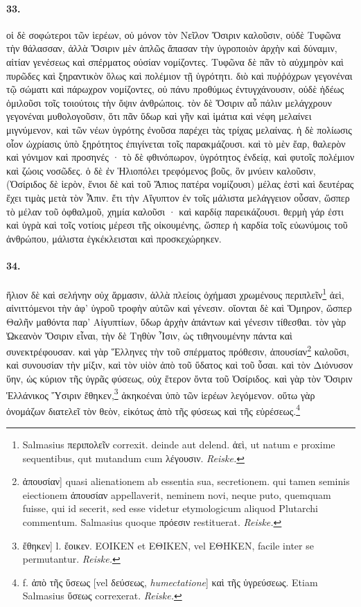\documentclass[a4paper, 11pt, oneside, polutonikogreek, german]{article}
\begin{document}
\paragraph{33.}
οἱ δὲ σοφώτεροι τῶν ἱερέων, οὐ μόνον τὸν Νεῖλον Ὄσιριν καλοῦσιν, οὐδὲ Τυφῶνα τὴν θάλασσαν, ἀλλὰ Ὄσιριν μὲν ἁπλῶς ἅπασαν τὴν ὑγροποιὸν ἀρχὴν καὶ δύναμιν, αἰτίαν γενέσεως καὶ σπέρματος οὐσίαν νομίζοντες. Τυφῶνα δὲ πᾶν τὸ αὐχμηρὸν καὶ πυρῶδες καὶ ξηραντικὸν ὅλως καὶ πολέμιον τῇ ὑγρότητι. διὸ καὶ πυῤῥόχρων γεγονέναι τῷ σώματι καὶ πάρωχρον νομίζοντες, οὐ πάνυ προθύμως ἐντυγχάνουσιν, οὐδὲ ἡδέως ὁμιλοῦσι τοῖς τοιούτοις τὴν ὄψιν ἀνθρώποις. τὸν δὲ Ὄσιριν αὖ πάλιν μελάγχρουν γεγονέναι μυθολογοῦσιν, ὅτι πᾶν ὕδωρ καὶ γῆν καὶ ἱμάτια καὶ νέφη μελαίνει μιγνύμενον, καὶ τῶν νέων ὑγρότης ἐνοῦσα παρέχει τὰς τρίχας μελαίνας. ἡ δὲ πολίωσις οἷον ὠχρίασις ὑπὸ ξηρότητος ἐπιγίνεται τοῖς παρακμάζουσι. καὶ τὸ μὲν ἔαρ, θαλερὸν καὶ γόνιμον καὶ προσηνές · τὸ δὲ φθινόπωρον, ὑγρότητος ἐνδείᾳ, καὶ φυτοῖς πολέμιον καὶ ζώοις νοσῶδες. ὁ δὲ ἐν Ἡλιοπόλει τρεφόμενος βοῦς, ὃν μνύειν καλοῦσιν, (Ὀσίριδος δὲ ἱερὸν, ἔνιοι δὲ καὶ τοῦ Ἄπιος πατέρα νομίζουσι) μέλας ἐστὶ καὶ δευτέρας ἔχει τιμὰς μετὰ τὸν Ἆπιν. ἔτι τὴν Αἴγυπτον ἐν τοῖς μάλιστα μελάγγειον οὖσαν, ὥσπερ τὸ μέλαν τοῦ ὀφθαλμοῦ, χημία καλοῦσι · καὶ καρδίᾳ παρεικάζουσι. θερμὴ γάρ ἐστι καὶ ὑγρὰ καὶ τοῖς νοτίοις μέρεσι τῆς οἰκουμένης, ὥσπερ ἡ καρδία τοῖς εὐωνύμοις τοῦ ἀνθρώπου, μάλιστα ἐγκέκλεισται καὶ προσκεχώρηκεν.

\paragraph{34.}
ἥλιον δὲ καὶ σελήνην οὐχ ἅρμασιν, ἀλλὰ πλείοις ὀχήμασι χρωμένους περιπλεῖν\footnote{Salmasius περιπολεῖν correxit. deinde aut delend. ἁεὶ, ut natum e proxime sequentibus, qut mutandum cum λέγουσιν. \emph{Reiske.}} ἀεὶ, αἰνιττόμενοι τὴν ἀφ' ὑγροῦ τροφὴν αὐτῶν καὶ γένεσιν. οἴονται δὲ καὶ Ὅμηρον, ὥσπερ Θαλῆν μαθόντα παρ' Αἰγυπτίων, ὕδωρ ἀρχὴν ἁπάντων καὶ γένεσιν τίθεσθαι. τὸν γὰρ Ὠκεανὸν Ὄσιριν εἶναι, τὴν δὲ Τηθὺν Ἶσιν, ὡς τιθηνουμένην πάντα καὶ συνεκτρέφουσαν. καὶ γὰρ Ἕλληνες τὴν τοῦ σπέρματος πρόθεσιν, ἀπουσίαν\footnote{ἀπουσίαν] quasi alienationem ab essentia sua, secretionem. qui tamen seminis eiectionem ἀπουσίαν appellaverit, neminem novi, neque puto, quemquam fuisse, qui id secerit, sed esse videtur etymologicum aliquod Plutarchi commentum. Salmasius quoque πρόεσιν restituerat. \emph{Reiske.}} καλοῦσι, καὶ συνουσίαν τὴν μίξιν, καὶ τὸν υἱὸν ἀπὸ τοῦ ὕδατος καὶ τοῦ ὗσαι. καὶ τὸν Διόνυσον ὕην, ὡς κύριον τῆς ὑγρᾶς φύσεως, οὐχ ἕτερον ὄντα τοῦ Ὀσίριδος. καὶ γὰρ τὸν Ὄσιριν Ἑλλάνικος Ὕσιριν ἔθηκεν,\footnote{ἔθηκεν] l. ἔοικεν. ΕΟΙΚΕΝ et ΕΘΙΚΕΝ, vel ΕΘΗΚΕΝ, facile inter se permutantur. \emph{Reiske.}} ἀκηκοέναι ὑπὸ τῶν ἱερέων λεγόμενον. οὕτω γὰρ ὀνομάζων διατελεῖ τὸν θεὸν, εἰκότως ἀπὸ τῆς φύσεως καὶ τῆς εὑρέσεως.\footnote{f. ἀπὸ τῆς ὕσεως [vel δεύσεως, \emph{humectatione}] καὶ τῆς ὑγρεύσεως. Etiam Salmasius ὕσεως correxerat. \emph{Reiske.}}
\end{document}
